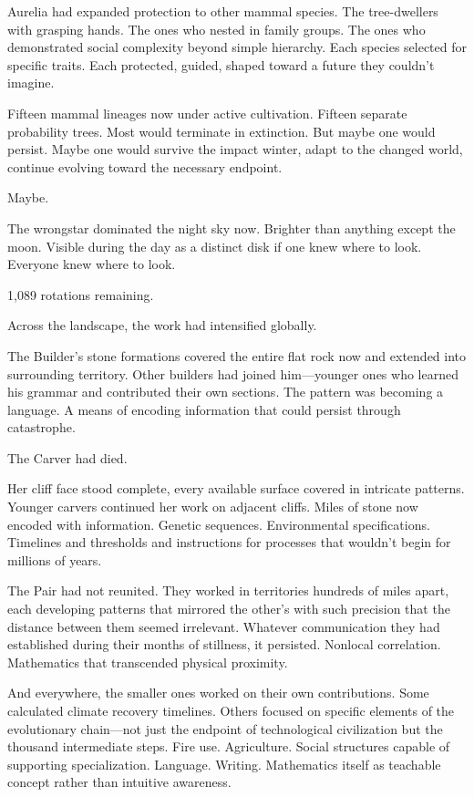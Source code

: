 Aurelia had expanded protection to other mammal species. The tree-dwellers with grasping hands. The ones who nested in family groups. The ones who demonstrated social complexity beyond simple hierarchy. Each species selected for specific traits. Each protected, guided, shaped toward a future they couldn't imagine.

Fifteen mammal lineages now under active cultivation. Fifteen separate probability trees. Most would terminate in extinction. But maybe one would persist. Maybe one would survive the impact winter, adapt to the changed world, continue evolving toward the necessary endpoint.

Maybe.

The wrongstar dominated the night sky now. Brighter than anything except the moon. Visible during the day as a distinct disk if one knew where to look. Everyone knew where to look.

1,089 rotations remaining.

\scenebreak

Across the landscape, the work had intensified globally.

The Builder's stone formations covered the entire flat rock now and extended into surrounding territory. Other builders had joined him—younger ones who learned his grammar and contributed their own sections. The pattern was becoming a language. A means of encoding information that could persist through catastrophe.

The Carver had died.

Her cliff face stood complete, every available surface covered in intricate patterns. Younger carvers continued her work on adjacent cliffs. Miles of stone now encoded with information. Genetic sequences. Environmental specifications. Timelines and thresholds and instructions for processes that wouldn't begin for millions of years.

The Pair had not reunited. They worked in territories hundreds of miles apart, each developing patterns that mirrored the other's with such precision that the distance between them seemed irrelevant. Whatever communication they had established during their months of stillness, it persisted. Nonlocal correlation. Mathematics that transcended physical proximity.

And everywhere, the smaller ones worked on their own contributions. Some calculated climate recovery timelines. Others focused on specific elements of the evolutionary chain—not just the endpoint of technological civilization but the thousand intermediate steps. Fire use. Agriculture. Social structures capable of supporting specialization. Language. Writing. Mathematics itself as teachable concept rather than intuitive awareness.

